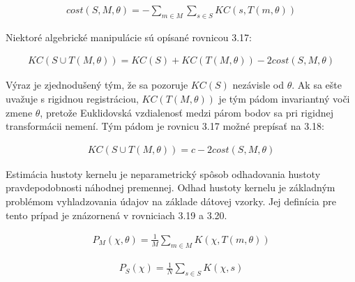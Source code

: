 \begin{equation}
\label{eq16}
\begin{aligned}
cost\left(S,M,\theta\right)= - \sum_{m\in M} \sum_{s\in S} KC \left(s, T\left(m, \theta \right)\right)
\end{aligned}
\end{equation}

Niektoré algebrické manipulácie sú opísané rovnicou 3.17:

\begin{equation}
\label{eq17}
\begin{aligned}
KC\left(S\cup T\left(M,\theta\right)\right) = KC\left(S\right) + KC\left(T \left(M, \theta \right)\right) - 2cost\left(S,M,\theta \right)
\end{aligned}
\end{equation}

Výraz je zjednodušený tým, že sa pozoruje $KC\left(S\right)$ nezávisle od $\theta$. Ak sa ešte uvažuje s rigidnou registráciou, $KC\left(T \left(M, \theta \right)\right)$ je tým pádom invariantný voči zmene $\theta$, pretože Euklidovská vzdialenosť medzi párom bodov sa pri rigidnej transformácii nemení. Tým pádom je rovnicu 3.17 možné prepísať na 3.18:

\begin{equation}
\label{eq18}
\begin{aligned}
KC\left(S\cup T\left(M,\theta\right)\right) = c - 2cost\left(S,M,\theta \right)
\end{aligned}
\end{equation}


Estimácia hustoty kernelu je neparametrický spôsob odhadovania hustoty pravdepodobnosti náhodnej premennej. Odhad hustoty kernelu je základným problémom vyhladzovania údajov na základe dátovej vzorky. Jej definícia pre tento prípad je znázornená v rovniciach 3.19 a 3.20.

\begin{equation}
\label{eq19}
\begin{aligned}
P_M\left( \chi,\theta\right)=\frac{1}{M}\sum_{m\in M} K\left(\chi,T\left(m,\theta\right)\right)
\end{aligned}
\end{equation}

\begin{equation}
\label{eq20}
\begin{aligned}
P_S\left( \chi\right)=\frac{1}{N}\sum_{s\in S} K\left(\chi,s\right)
\end{aligned}
\end{equation}

